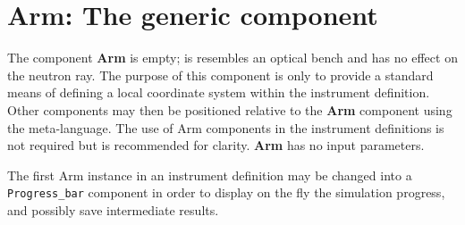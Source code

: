 \section{Arm: The generic component}
\label{explain:arm}

The component {\bf Arm} is empty; is resembles an optical bench
and has no effect on the neutron ray.
The purpose of this component is only to provide a standard
means of defining a local coordinate system within the instrument definition.
Other components may then be
positioned relative to the {\bf Arm} component
using the \MCS meta-language.
The use of {\rm Arm} components in the instrument definitions
is not required but is recommended for clarity.
{\bf Arm} has no input parameters.

The first Arm instance in an instrument definition may be changed into a \verb+Progress_bar+ component in order to display on the fly the simulation progress, and possibly save intermediate results.
